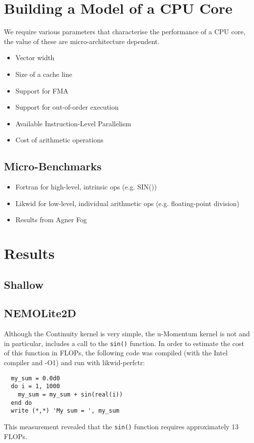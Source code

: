\documentclass[12pt]{article}
\begin{document}
\section{Building a Model of a CPU Core}

We require various parameters that characterise the performance of a
CPU core, the value of these are micro-architecture dependent.

\begin{itemize}
\item Vector width
\item Size of a cache line
\item Support for FMA
\item Support for out-of-order execution
\item Available Instruction-Level Parallelism
\item Cost of arithmetic operations
\end{itemize}

\subsection{Micro-Benchmarks}

\begin{itemize}
\item Fortran for high-level, intrinsic ops (e.g. SIN())
\item Likwid for low-level, individual arithmetic ops (e.g. floating-point division)
\item Results from Agner Fog
\end{itemize}

\section{Results}

\subsection{Shallow}

\subsection{NEMOLite2D}

Although the Continuity kernel is very simple, the u-Momentum kernel
is not and in particular, includes a call to the {\tt sin()} function.
In order to estimate the cost of this function in FLOPs, the following
code was compiled (with the Intel compiler and -O1) and run with
likwid-perfctr:
\begin{verbatim}
  my_sum = 0.0d0
  do i = 1, 1000
    my_sum = my_sum + sin(real(i))
  end do
  write (*,*) 'My sum = ', my_sum
\end{verbatim}
This measurement revealed that the {\tt sin()} function requires
approximately 13 FLOPs.
\end{document}
